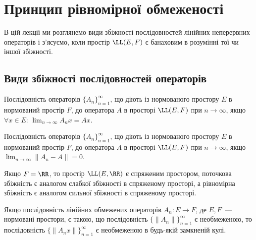 \chapter{Принцип рівномірної обмеженості}

В цій лекції ми розглянемо види збіжності послідовностей
лінійних неперервних операторів і з’ясуємо, коли простір
$\LL(E, F)$ є банаховим в розумінні тої чи іншої збіжності.

\section{Види збіжності послідовностей операторів}

\begin{definition}
Послідовність операторів $\{A_n\}_{n = 1}^\infty$, що діють із
нормованого простору $E$ в нормований простір $F$,
 до оператора $A$ в просторі $\LL(E, F)$
при $n \to \infty$, якщо $\forall x \in E$: $\lim_{n \to \infty} A_n x = A x$.
\end{definition}

\begin{definition}
Послідовність операторів $\{A_n\}_{n = 1}^\infty$, що діють із
нормованого простору $E$ в нормований простір $F$,
 до оператора $A$ в просторі $\LL(E, F)$
при $n \to \infty$, якщо $\lim_{n \to \infty} \|A_n - A\| = 0$.
\end{definition}

\begin{remark}
Якщо $F = \RR$, то простір $\LL(E, \RR)$ є
спряженим простором, поточкова збіжність є аналогом
слабкої збіжності в спряженому просторі, а рівномірна
збіжність є аналогом сильної збіжності в спряженому
просторі.
\end{remark}

\begin{lemma}
Якщо послідовність лінійних обмежених
операторів $A_n: E \to F$, де $E, F$~--- нормовані простори, є
такою, що послідовність $\{\|A_n\|\}_{n = 1}^\infty$
є необмеженою, то послідовність $\{\|A_n x\|\}_{n = 1}^\infty$
є необмеженою в будь-якій замкненій кулі.
\end{lemma}

